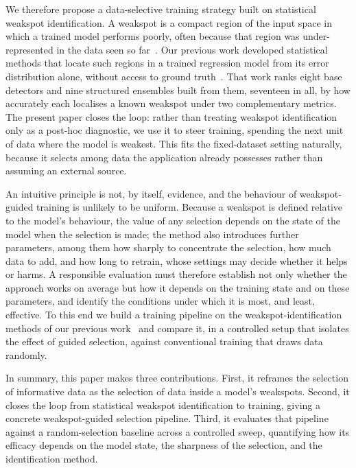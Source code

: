 \documentclass[conference]{IEEEtran}
\begin{document}
We therefore propose a data-selective training strategy built on statistical
weakspot identification. A weakspot is a compact region of the input space in
which a trained model performs poorly, often because that region was
under-represented in the data seen so far~\cite{ovadia2019}. Our
previous work developed statistical methods that locate such regions in a trained
regression model from its error distribution alone, without access to ground
truth~\cite{weakspotprior}. That work ranks eight base detectors and nine structured
ensembles built from them, seventeen in all, by how accurately each localises a known
weakspot under two complementary metrics.
The present paper closes the
loop: rather than treating weakspot identification only as a post-hoc diagnostic,
we use it to steer training, spending the next unit of data where the model is weakest.
This fits the fixed-dataset setting naturally, because it selects among data the application
already possesses rather than assuming an external source.

An intuitive principle is not, by itself, evidence, and the behaviour of
weakspot-guided training is unlikely to be uniform. Because a weakspot is defined
relative to the model's behaviour, the value of any selection depends on the state of
the model when the selection is made; the method also introduces further parameters,
among them how sharply to concentrate the selection, how much data to add, and how long
to retrain, whose settings may decide whether it helps or harms. A responsible
evaluation must therefore establish not only whether the approach works on average but
how it depends on the training state and on these parameters, and identify the
conditions under which it is most, and least, effective. To this end we build a training
pipeline on the weakspot-identification methods of our previous work~\cite{weakspotprior}
and compare it, in a controlled setup that isolates the effect of guided selection,
against conventional training that draws data randomly.

In summary, this paper makes three contributions. First, it reframes the
selection of informative data as the selection of data inside a model's
weakspots. Second, it closes the loop from statistical weakspot identification to
training, giving a concrete weakspot-guided selection pipeline. Third, it
evaluates that pipeline against a random-selection baseline across a controlled
sweep, quantifying how its efficacy depends on the model state, the sharpness of
the selection, and the identification method.
\end{document}
